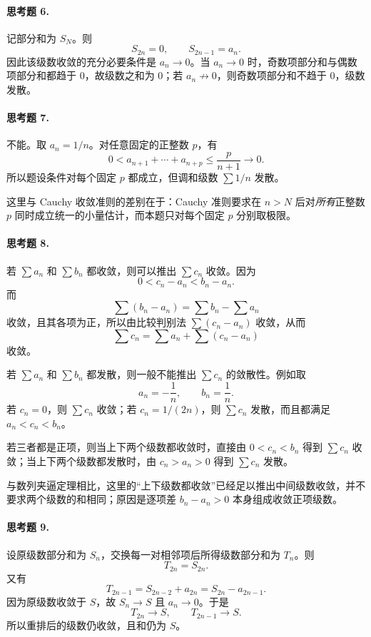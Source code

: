 \paragraph{思考题 6.}
\begin{xsolution}
记部分和为 $S_N$。则
\[
 S_{2n}=0,
 \qquad
 S_{2n-1}=a_n.
\]
因此该级数收敛的充分必要条件是 $a_n\to0$。当 $a_n\to0$ 时，奇数项部分和与偶数项部分和都趋于 $0$，故级数之和为 $0$；若 $a_n\not\to0$，则奇数项部分和不趋于 $0$，级数发散。
\end{xsolution}

\paragraph{思考题 7.}
\begin{xsolution}
不能。取 $a_n=1/n$。对任意固定的正整数 $p$，有
\[
 0<a_{n+1}+\cdots+a_{n+p}
 \leq \frac{p}{n+1}\longrightarrow0.
\]
所以题设条件对每个固定 $p$ 都成立，但调和级数 $\sum1/n$ 发散。

这里与 Cauchy 收敛准则的差别在于：Cauchy 准则要求在 $n>N$ 后对\emph{所有}正整数 $p$ 同时成立统一的小量估计，而本题只对每个固定 $p$ 分别取极限。
\end{xsolution}

\paragraph{思考题 8.}
\begin{xsolution}
若 $\sum a_n$ 和 $\sum b_n$ 都收敛，则可以推出 $\sum c_n$ 收敛。因为
\[
 0<c_n-a_n<b_n-a_n.
\]
而
\[
 \sum(b_n-a_n)=\sum b_n-\sum a_n
\]
收敛，且其各项为正，所以由比较判别法 $\sum(c_n-a_n)$ 收敛，从而
\[
 \sum c_n=\sum a_n+\sum(c_n-a_n)
\]
收敛。

若 $\sum a_n$ 和 $\sum b_n$ 都发散，则一般不能推出 $\sum c_n$ 的敛散性。例如取
\[
 a_n=-\frac1n,\qquad b_n=\frac1n.
\]
若 $c_n=0$，则 $\sum c_n$ 收敛；若 $c_n=1/(2n)$，则 $\sum c_n$ 发散，而且都满足 $a_n<c_n<b_n$。

若三者都是正项，则当上下两个级数都收敛时，直接由 $0<c_n<b_n$ 得到 $\sum c_n$ 收敛；当上下两个级数都发散时，由 $c_n>a_n>0$ 得到 $\sum c_n$ 发散。

与数列夹逼定理相比，这里的“上下级数都收敛”已经足以推出中间级数收敛，并不要求两个级数的和相同；原因是逐项差 $b_n-a_n>0$ 本身组成收敛正项级数。
\end{xsolution}

\paragraph{思考题 9.}
\begin{xsolution}
设原级数部分和为 $S_n$，交换每一对相邻项后所得级数部分和为 $T_n$。则
\[
 T_{2n}=S_{2n}.
\]
又有
\[
 T_{2n-1}=S_{2n-2}+a_{2n}
 =S_{2n}-a_{2n-1}.
\]
因为原级数收敛于 $S$，故 $S_n\to S$ 且 $a_n\to0$。于是
\[
 T_{2n}\to S,
 \qquad
 T_{2n-1}\to S.
\]
所以重排后的级数仍收敛，且和仍为 $S$。
\end{xsolution}

